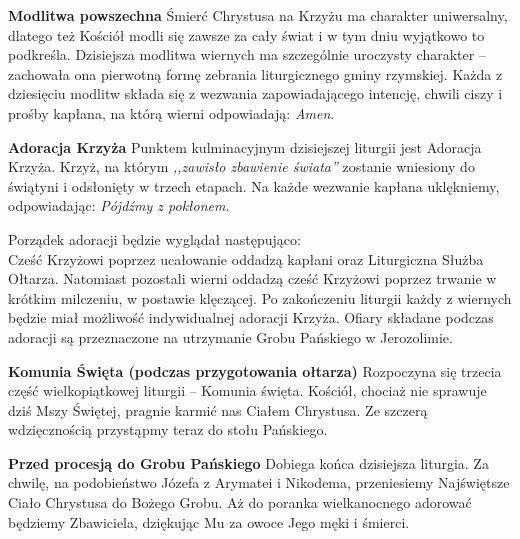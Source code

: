 \documentclass[10pt,oneside,final,notitlepage,a4paper,wide]{mwart}
\begin{document}
	\textbf{Modlitwa powszechna} Śmierć Chrystusa na Krzyżu ma charakter uniwersalny, dlatego też Kościół modli się zawsze za cały świat i w tym dniu wyjątkowo to podkreśla. Dzisiejsza modlitwa wiernych ma szczególnie uroczysty charakter -- zachowała ona pierwotną formę zebrania liturgicznego gminy rzymskiej. Każda z dziesięciu modlitw składa się z wezwania zapowiadającego intencję, chwili ciszy i prośby kapłana, na którą wierni odpowiadają: \emph{Amen}.\bigskip
	
	\textbf{Adoracja Krzyża} Punktem kulminacyjnym dzisiejszej liturgii jest Adoracja Krzyża. Krzyż, na którym \emph{,,zawisło zbawienie świata''} zostanie wniesiony do świątyni i odsłonięty w trzech etapach. Na każde wezwanie kapłana uklękniemy, odpowiadając: \emph{Pójdźmy z pokłonem}.
\par Porządek adoracji będzie wyglądał następująco:\\Cześć Krzyżowi poprzez ucałowanie oddadzą kapłani oraz Liturgiczna Służba Ołtarza. Natomiast pozostali wierni oddadzą cześć Krzyżowi poprzez trwanie w krótkim milczeniu, w postawie klęczącej. Po zakończeniu liturgii każdy z wiernych będzie miał możliwość indywidualnej adoracji Krzyża. Ofiary składane podczas adoracji są przeznaczone na utrzymanie Grobu Pańskiego w Jerozolimie.\bigskip
	
	\textbf{Komunia Święta (podczas przygotowania ołtarza)} Rozpoczyna się trzecia część wielkopiątkowej liturgii -- Komunia święta. Kościół, chociaż nie sprawuje dziś Mszy Świętej, pragnie karmić nas Ciałem Chrystusa. Ze szczerą wdzięcznością przystąpmy teraz do stołu Pańskiego. \bigskip
	
	\textbf{Przed procesją do Grobu Pańskiego} Dobiega końca dzisiejsza liturgia. Za chwilę, na podobieństwo Józefa z Arymatei i Nikodema, przeniesiemy Najświętsze Ciało Chrystusa do Bożego Grobu. Aż do poranka wielkanocnego adorować będziemy Zbawiciela, dziękując Mu za owoce Jego męki i śmierci.
\end{document}
